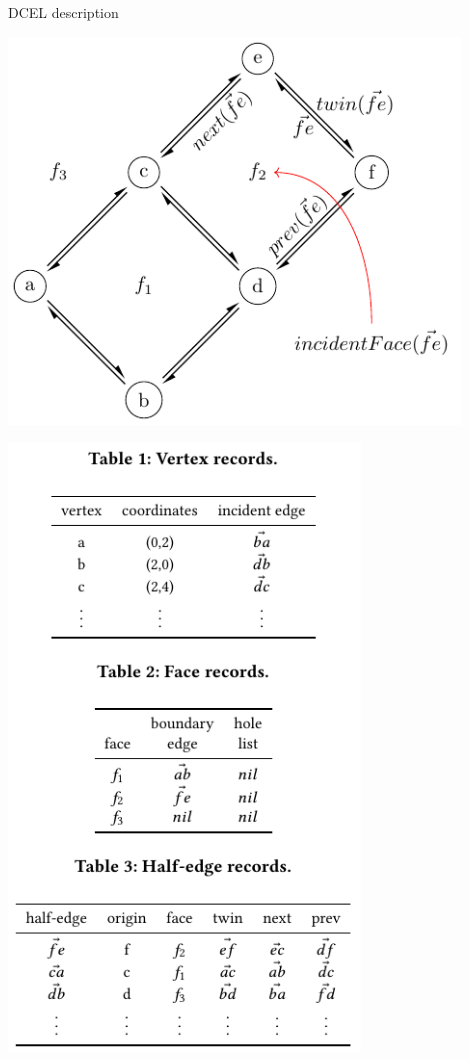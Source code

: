 \documentclass{beamer}
\begin{document}
    \begin{frame}{DCEL description}
        \begin{minipage}{0.49\textwidth}
            \centering
            \includegraphics[width=0.9\textwidth]{figures/dcel_example}
        \end{minipage}\hfill %
        \begin{minipage}{0.49\textwidth}
            \centering
            \includegraphics[width=0.7\textwidth]{figures/dcel_records}
        \end{minipage}
    \end{frame}
\end{document}
